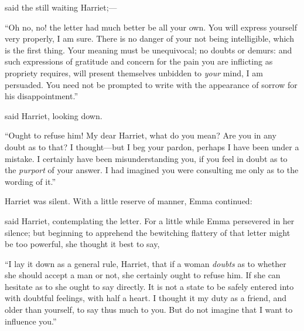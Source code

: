  said the still waiting Harriet;---





“Oh no, no! the letter had much better be all your own. You will express yourself very properly, I am sure. There is no danger of your not being intelligible, which is the first thing. Your meaning must be unequivocal; no doubts or demurs: and such expressions of gratitude and concern for the pain you are inflicting as propriety requires, will present themselves unbidden to {\em your} mind, I am persuaded. You need not be prompted to write with the appearance of sorrow for his disappointment.”

 said Harriet, looking down.

“Ought to refuse him! My dear Harriet, what do you mean? Are you in any doubt as to that? I thought---but I beg your pardon, perhaps I have been under a mistake. I certainly have been misunderstanding you, if you feel in doubt as to the {\em purport} of your answer. I had imagined you were consulting me only as to the wording of it.”

Harriet was silent. With a little reserve of manner, Emma continued:




 said Harriet, contemplating the letter. For a little while Emma persevered in her silence; but beginning to apprehend the bewitching flattery of that letter might be too powerful, she thought it best to say,

“I lay it down as a general rule, Harriet, that if a woman {\em doubts} as to whether she should accept a man or not, she certainly ought to refuse him. If she can hesitate as to  she ought to say  directly. It is not a state to be safely entered into with doubtful feelings, with half a heart. I thought it my duty as a friend, and older than yourself, to say thus much to you. But do not imagine that I want to influence you.”

